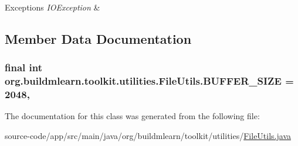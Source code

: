\begin{DoxyExceptions}{Exceptions}
{\em I\+O\+Exception} & \\
\hline
\end{DoxyExceptions}


\subsection{Member Data Documentation}
\subsubsection[{\texorpdfstring{B\+U\+F\+F\+E\+R\+\_\+\+S\+I\+ZE}{BUFFER_SIZE}}]{\setlength{\rightskip}{0pt plus 5cm}final int org.\+buildmlearn.\+toolkit.\+utilities.\+File\+Utils.\+B\+U\+F\+F\+E\+R\+\_\+\+S\+I\+ZE = 2048\hspace{0.3cm}{\ttfamily [static]}, {\ttfamily [private]}}\hypertarget{classorg_1_1buildmlearn_1_1toolkit_1_1utilities_1_1FileUtils_a4b6b661a3961f90ac6e422a62bde8521}{}\label{classorg_1_1buildmlearn_1_1toolkit_1_1utilities_1_1FileUtils_a4b6b661a3961f90ac6e422a62bde8521}


The documentation for this class was generated from the following file\+:\begin{DoxyCompactItemize}
\item 
source-\/code/app/src/main/java/org/buildmlearn/toolkit/utilities/\hyperlink{FileUtils_8java}{File\+Utils.\+java}\end{DoxyCompactItemize}
